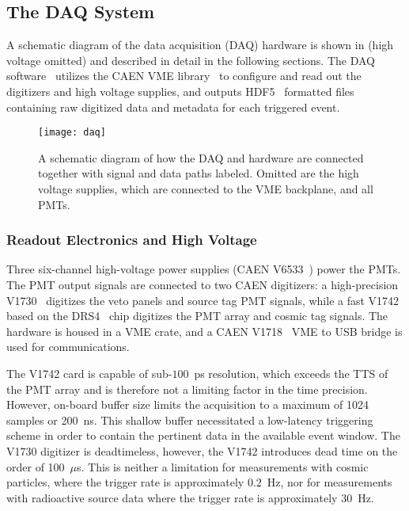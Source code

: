 \subsection{The DAQ System \label{sec:daq}}

A schematic diagram of the data acquisition (DAQ) hardware is shown in   (high voltage omitted) and described in detail in the following sections. 
The DAQ software~\cite{wblsdaq} utilizes the CAEN VME library~\cite{caen-vme} to configure and read out the digitizers and high voltage supplies, and outputs HDF5~\cite{hdf5} formatted files containing raw digitized data and metadata for each triggered event.

\begin{figure}
\centering
\texttt{[image: daq]}
\caption{A schematic diagram of how the DAQ and hardware are connected together with signal and data paths labeled. Omitted are the high voltage supplies, which are connected to the VME backplane, and all PMTs.}
\label{fig:daq}
\end{figure}


\subsubsection{Readout Electronics and High Voltage}
Three six-channel high-voltage power supplies (CAEN V6533~\cite{v6533}) power the PMTs. 
The PMT output signals are connected to two CAEN digitizers: a high-precision V1730~\cite{v1730} digitizes the veto panels and source tag PMT signals, while a fast V1742~\cite{v1742} based on the DRS4~\cite{drs4} chip digitizes the PMT array and cosmic tag signals.  The hardware is housed in a VME crate, and a CAEN V1718~\cite{v1718} VME to USB bridge is used for communications.  

The V1742 card is capable of sub-$100$~ps resolution, which exceeds the TTS of the PMT array and is therefore not a limiting factor in the time precision.  However, on-board buffer size limits the acquisition to a maximum of 1024 samples or 200~ns. This shallow buffer necessitated a low-latency triggering scheme in order to contain the pertinent data in the available event window. The V1730 digitizer is deadtimeless, however, the V1742 introduces dead time on the order of 100~$\mu$s.  This is neither a limitation for measurements with cosmic particles, where the trigger rate is approximately $0.2$~Hz, nor for measurements with radioactive source data where the trigger rate is approximately $30$~Hz.  
  


